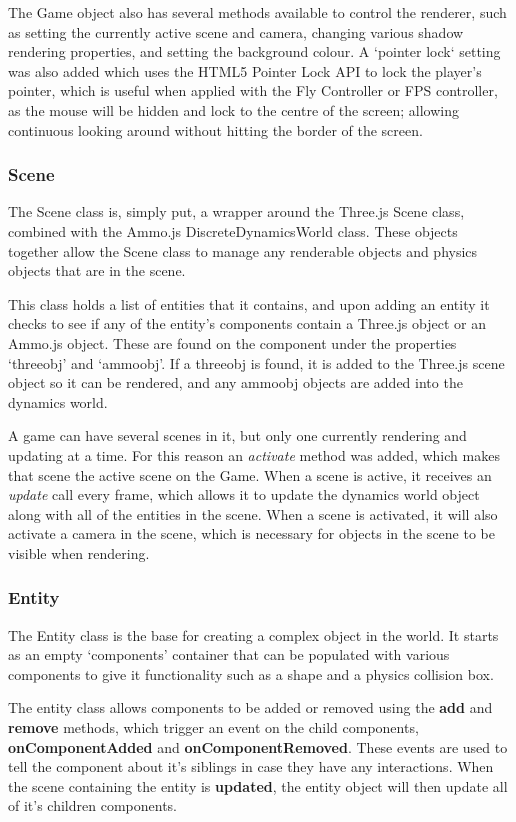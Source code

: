 	The Game object also has several methods available to control the renderer, such as setting the currently active scene and camera, changing various shadow rendering properties, and setting the background colour. A `pointer lock` setting was also added which uses the HTML5 Pointer Lock API to lock the player's pointer, which is useful when applied with the Fly Controller or FPS controller, as the mouse will be hidden and lock to the centre of the screen; allowing continuous looking around without hitting the border of the screen.\cite{pointerlock}

	\subsubsection{Scene}
	The Scene class is, simply put, a wrapper around the Three.js Scene class, combined with the Ammo.js DiscreteDynamicsWorld class. These objects together allow the Scene class to manage any renderable objects and physics objects that are in the scene.

	This class holds a list of entities that it contains, and upon adding an entity it checks to see if any of the entity's components contain a Three.js object or an Ammo.js object. These are found on the component under the properties `threeobj' and `ammoobj'. If a threeobj is found, it is added to the Three.js scene object so it can be rendered, and any ammoobj objects are added into the dynamics world.

	A game can have several scenes in it, but only one currently rendering and updating at a time. For this reason an \emph{activate} method was added, which makes that scene the active scene on the Game. When a scene is active, it receives an \emph{update} call every frame, which allows it to update the dynamics world object along with all of the entities in the scene. When a scene is activated, it will also activate a camera in the scene, which is necessary for objects in the scene to be visible when rendering.

	\subsubsection{Entity}
	The Entity class is the base for creating a complex object in the world. It starts as an empty `components' container that can be populated with various components to give it functionality such as a shape and a physics collision box. 

	The entity class allows components to be added or removed using the \textbf{add} and \textbf{remove} methods, which trigger an event on the child components, \textbf{onComponentAdded} and \textbf{onComponentRemoved}. These events are used to tell the component about it's siblings in case they have any interactions. When the scene containing the entity is \textbf{updated}, the entity object will then update all of it's children components.

